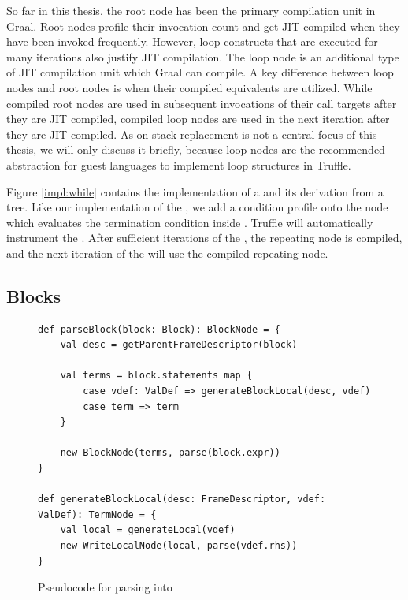 So far in this thesis, the root node has been the primary compilation unit in Graal.
Root nodes profile their invocation count and get JIT compiled when they have been invoked frequently.
However, loop constructs that are executed for many iterations also justify JIT compilation.
The loop node is an additional type of JIT compilation unit which Graal can compile.
A key difference between loop nodes and root nodes is when their compiled equivalents are utilized.
While compiled root nodes are used in subsequent invocations of their call targets after they are JIT compiled, compiled loop nodes are used in the next iteration after they are JIT compiled.
As on-stack replacement is not a central focus of this thesis, we will only discuss it briefly, because loop nodes are the recommended abstraction for guest languages to implement loop structures in Truffle.

Figure \ref{impl:while} contains the implementation of a  and its derivation from a  tree.
Like our implementation of the , we add a condition profile onto the node which evaluates the termination condition inside .
Truffle will automatically instrument the .
After sufficient iterations of the , the repeating node is compiled, and the next iteration of the  will use the compiled repeating node.

\subsection{Blocks}

\begin{figure}[!htb]
\begin{verbatim}
def parseBlock(block: Block): BlockNode = {
	val desc = getParentFrameDescriptor(block)
		
	val terms = block.statements map {
		case vdef: ValDef => generateBlockLocal(desc, vdef)
		case term => term 
	}
		
	new BlockNode(terms, parse(block.expr))
}
	
def generateBlockLocal(desc: FrameDescriptor, vdef: ValDef): TermNode = {
	val local = generateLocal(vdef)
	new WriteLocalNode(local, parse(vdef.rhs))
}	
\end{verbatim}
\caption{Pseudocode for parsing  into }
\label{impl:parse-block}
\end{figure}

